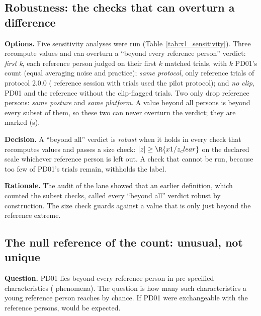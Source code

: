 \subsection{Robustness: the checks that can overturn a difference}\label{app:pd01:robustness}

\textbf{Options.}
Five sensitivity analyses were run (Table~\ref{tab:x1_sensitivity}).
Three recompute values and can overturn a ``beyond every reference person'' verdict:
\emph{first k}, each reference person judged on their first $k$ matched trials, with $k$ PD01's count (equal averaging noise and practice);
\emph{same protocol}, only reference trials of protocol 2.0.0 ( reference session with  trials used the pilot protocol);
and \emph{no clip}, PD01 and the reference without the clip-flagged trials.
Two only drop reference persons: \emph{same posture} and \emph{same platform}.
A value beyond all  persons is beyond every subset of them, so these two can never overturn the verdict; they are marked (s).

\textbf{Decision.}
A ``beyond all'' verdict is \emph{robust} when it holds in every check that recomputes values and passes a size check: $|z| \ge \R{x1/z_clear}$ on the declared scale whichever reference person is left out.
A check that cannot be run, because too few of PD01's trials remain, withholds the label.

\textbf{Rationale.}
The audit of the lane showed that an earlier definition, which counted the subset checks, called every ``beyond all'' verdict robust by construction.
The size check guards against a value that is only just beyond the reference extreme.

\subsection{The null reference of the count: unusual, not unique}\label{app:pd01:null}

\textbf{Question.}
PD01 lies beyond every reference person in  pre-specified characteristics ( phenomena).
The question is how many such characteristics a young reference person reaches by chance.
If PD01 were exchangeable with the reference persons,  would be expected.

